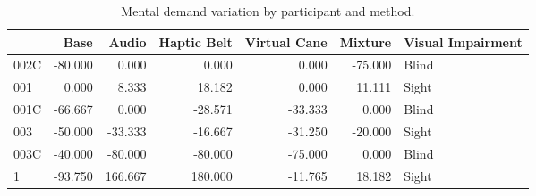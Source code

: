 
\begin{table}[!htb]
\centering
\caption{Mental demand variation by participant and method.}
\label{tab:md_var}
\begin{tabular}{lrrrrrl}
\toprule
{} &    Base &   Audio &  Haptic Belt &  Virtual Cane &  Mixture & Visual Impairment \\
\midrule
002C & -80.000 &   0.000 &        0.000 &         0.000 &  -75.000 &             Blind \\
001  &   0.000 &   8.333 &       18.182 &         0.000 &   11.111 &             Sight \\
001C & -66.667 &   0.000 &      -28.571 &       -33.333 &    0.000 &             Blind \\
003  & -50.000 & -33.333 &      -16.667 &       -31.250 &  -20.000 &             Sight \\
003C & -40.000 & -80.000 &      -80.000 &       -75.000 &    0.000 &             Blind \\
1    & -93.750 & 166.667 &      180.000 &       -11.765 &   18.182 &             Sight \\
\bottomrule
\end{tabular}
\end{table}

